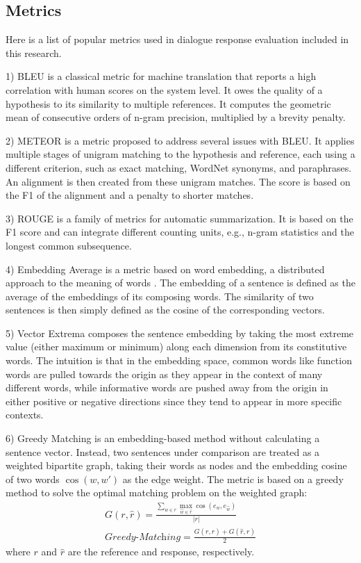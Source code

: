 \documentclass[runningheads]{llncs}
\begin{document}
    \subsection{Metrics}
    Here is a list of popular metrics used in dialogue response evaluation included in this research.

    1) BLEU \cite{BLEU} is a classical metric for machine translation that reports a high correlation with human scores on the system level. It owes the quality of a hypothesis to its similarity to multiple references. It computes the geometric mean of consecutive orders of n-gram precision, multiplied by a brevity penalty.

    2) METEOR \cite{METEOR} is a metric proposed to address several issues with BLEU. It applies multiple stages of unigram matching to the hypothesis and reference, each using a different criterion, such as exact matching, WordNet synonyms, and paraphrases. An alignment is then created from these unigram matches. The score is based on the F1 of the alignment and a penalty to shorter matches.

    3) ROUGE \cite{ROUGE} is a family of metrics for automatic summarization. It is based on the F1 score and can integrate different counting units, e.g., n-gram statistics and the longest common subsequence.

    4) Embedding Average is a metric based on word embedding, a distributed approach to the meaning of words \cite{word2vec}. The embedding of a sentence is defined as the average of the embeddings of its composing words. The similarity of two sentences is then simply defined as the cosine of the corresponding vectors.

    5) Vector Extrema \cite{Vector_Extrema} composes the sentence embedding by taking the most extreme value (either maximum or minimum) along each dimension from its constitutive words. The intuition is that in the embedding space, common words like function words are pulled towards the origin as they appear in the context of many different words, while informative words are pushed away from the origin in either positive or negative directions since they tend to appear in more specific contexts.

    6) Greedy Matching \cite{GreedyAndOptimal} is an embedding-based method without calculating a sentence vector. Instead, two sentences under comparison are treated as a weighted bipartite graph, taking their words as nodes and the embedding cosine of two words $\cos(w, w')$ as the edge weight. The metric is based on a greedy method to solve the optimal matching problem on the weighted graph:
    \begin{align}
        G(r, \hat{r}) = \frac{
        \sum_{w \in r} \max_{\hat{w} \in \hat{r}} \cos(e_w, e_{\hat{w}})
        }{ |r| } \\
        \textit{Greedy-Matching} = \frac{
        G(r, \hat{r}) + G(\hat{r}, r)
        }{2}
    \end{align}
    where $r$ and $\hat{r}$ are the reference and response, respectively.
\end{document}
